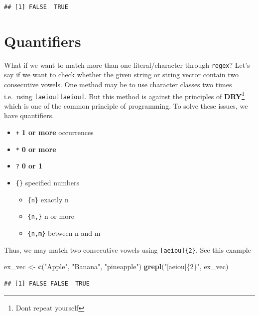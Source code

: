 \documentclass[
]{book}
\newenvironment{Shaded}{\begin{snugshade}}{\end{snugshade}}
\newcommand{\FunctionTok}[1]{\textcolor[rgb]{0.13,0.29,0.53}{\textbf{#1}}}
\newcommand{\NormalTok}[1]{#1}
\newcommand{\OtherTok}[1]{\textcolor[rgb]{0.56,0.35,0.01}{#1}}
\newcommand{\StringTok}[1]{\textcolor[rgb]{0.31,0.60,0.02}{#1}}
\providecommand{\tightlist}{%
  \setlength{\itemsep}{0pt}\setlength{\parskip}{0pt}}
\begin{document}
\begin{verbatim}
## [1] FALSE  TRUE
\end{verbatim}

\hypertarget{quantifiers}{%
\section{Quantifiers}\label{quantifiers}}

What if we want to match more than one literal/character through \texttt{regex}? Let's say if we want to check whether the given string or string vector contain two consecutive vowels. One method may be to use character classes two times i.e.~using \texttt{{[}aeiou{]}{[}aeiou{]}}. But this method is against the principles of \textbf{DRY}\footnote{Dont repeat yourself} which is one of the common principle of programming. To solve these issues, we have quantifiers.

\begin{itemize}
\tightlist
\item
  \texttt{+} \textbf{1 or more} occurrences
\item
  \texttt{*} \textbf{0 or more}
\item
  \texttt{?} \textbf{0 or 1}
\item
  \texttt{\{\}} specified numbers

  \begin{itemize}
  \tightlist
  \item
    \texttt{\{n\}} exactly n
  \item
    \texttt{\{n,\}} n or more
  \item
    \texttt{\{n,m\}} between n and m
  \end{itemize}
\end{itemize}

Thus, we may match two consecutive vowels using \texttt{{[}aeiou{]}\{2\}}. See this example

\begin{Shaded}
\begin{Highlighting}[]
\NormalTok{ex\_vec }\OtherTok{\textless{}{-}} \FunctionTok{c}\NormalTok{(}\StringTok{"Apple"}\NormalTok{, }\StringTok{"Banana"}\NormalTok{, }\StringTok{"pineapple"}\NormalTok{)}
\FunctionTok{grepl}\NormalTok{(}\StringTok{"[aeiou]\{2\}"}\NormalTok{, ex\_vec)}
\end{Highlighting}
\end{Shaded}

\begin{verbatim}
## [1] FALSE FALSE  TRUE
\end{verbatim}
\end{document}
